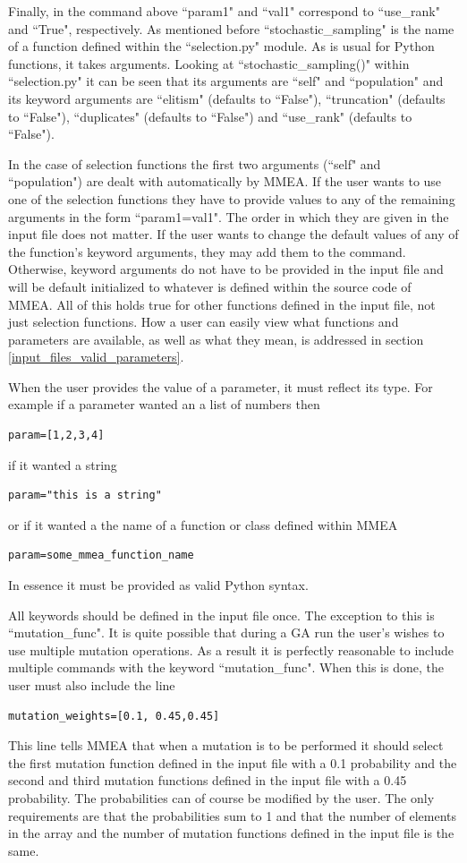 \documentclass[12pt]{article}
\begin{document}
Finally, in the command above ``param1" and ``val1" correspond to ``use\_rank" and ``True", respectively. As mentioned before ``stochastic\_sampling" is the name of a function defined within the ``selection.py" module. As is usual for Python functions, it takes arguments. Looking at ``stochastic\_sampling()" within ``selection.py" it can be seen that its arguments are ``self" and ``population" and its keyword arguments are ``elitism" (defaults to ``False"), ``truncation" (defaults to ``False"), ``duplicates" (defaults to ``False") and ``use\_rank" (defaults to ``False").

In the case of selection functions the first two arguments (``self" and ``population") are dealt with automatically by MMEA. If the user wants to use one of the selection functions they have to provide values to any of the remaining arguments in the form ``param1=val1". The order in which they are given in the input file does not matter. If the user wants to change the default values of any of the function's keyword arguments, they may add them to the command. Otherwise, keyword arguments do not have to be provided in the input file and will be default initialized to whatever is defined within the source code of MMEA. All of this holds true for other functions defined in the input file, not just selection functions. How a user can easily view what functions and parameters are available, as well as what they mean, is addressed in section \ref{input_files_valid_parameters}.

When the user provides the value of a parameter, it must reflect its type. For example if a parameter wanted an a list of numbers then
\begin{verbatim}
param=[1,2,3,4]
\end{verbatim}
if it wanted a string
\begin{verbatim}
param="this is a string"
\end{verbatim}
or if it wanted a the name of a function or class defined within MMEA
\begin{verbatim}
param=some_mmea_function_name
\end{verbatim}
In essence it must be provided as valid Python syntax.

All keywords should be defined in the input file once. The exception to this is ``mutation\_func". It is quite possible that during a GA run the user's wishes to use multiple mutation operations. As a result it is perfectly reasonable to include multiple commands with the keyword  ``mutation\_func". When this is done, the user must also include the line 
\begin{verbatim}
mutation_weights=[0.1, 0.45,0.45]
\end{verbatim}
This line tells MMEA that when a mutation is to be performed it should select the first mutation function defined in the input file with a 0.1 probability and the second and third mutation functions defined in the input file with a 0.45 probability. The probabilities can of course be modified by the user. The only requirements are that the probabilities sum to 1 and that the number of elements in the array and the number of mutation functions defined in the input file is the same.
\end{document}
